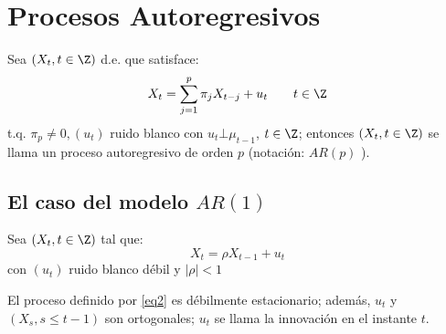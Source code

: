 \section{Procesos Autoregresivos}

\begin{definicion}
 Sea $\left( {X_{t} ,t\in \Z} \right)$ d.e. que satisface:
\[
X_{t} =\sum_{j=1}^p {\pi_{j} X_{t-j} +u_{t} } 
\qquad
t\in \Z
\]
t.q. $\pi_{p} \ne 0, \left( {u_{t} } \right)$ ruido blanco con 
$u_{t} \bot \mu_{t-1} $, $t\in \Z$; entonces $\left( {X_{t} ,t\in 
\Z} \right)$ se llama un proceso autoregresivo de orden 
$p$ (notaci\'{o}n: $AR(p)$ ).
\end{definicion}


\subsection{El caso del modelo $AR(1)$}

Sea $\left( {X_{t} ,t\in \Z} \right)$ tal que:
\begin{equation}
\label{eq2}
X_{t} =\rho X_{t-1} +u_{t} 
\end{equation}
con $\left( {u_{t} } \right)$ ruido blanco d\'{e}bil y $\left| \rho 
\right|<1$ 

El proceso definido por \eqref{eq2} es d\'{e}bilmente estacionario; adem\'{a}s, 
$u_{t} $ y $\left( {X_{s} ,s\le t-1} \right)$ son ortogonales; $u_{t} $ se 
llama la innovaci\'{o}n en el instante $t$.


